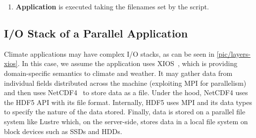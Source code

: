 \documentclass{superfri}
\begin{document}
\begin{enumerate}
  \item \textbf{Application} is executed taking the filenames set by the script.

\end{enumerate}

\subsection{I/O Stack of a Parallel Application}

Climate applications may have complex I/O stacks, as can be seen in \cref{pic/layers-xios}.
In this case, we assume the application uses XIOS~\cite{xios}, which is providing domain-specific semantics to climate and weather.
It may gather data from individual fields distributed across the machine (exploiting MPI for parallelism) and then uses NetCDF4~\cite{netcdf} to store data as a file.
Under the hood, NetCDF4 uses the HDF5 API with its file format.
Internally, HDF5 uses MPI and its data types to specify the nature of the data stored.
Finally, data is stored on a parallel file system like Lustre which, on the server-side, stores data in a local file system on block devices such as SSDs and HDDs.
\end{document}
